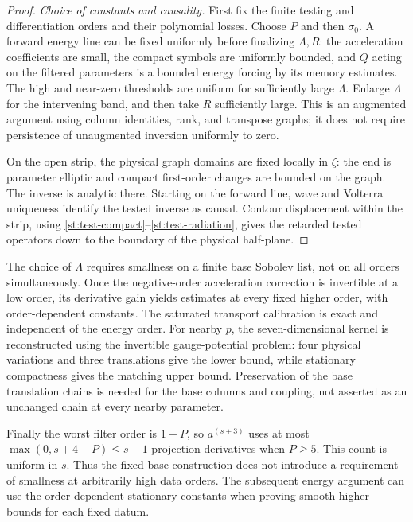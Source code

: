 \begin{proof}
\emph{Choice of constants and causality.}
First fix the finite testing and differentiation orders and
their polynomial losses.  Choose $P$ and then $\sigma_0$.
A forward energy line can be fixed uniformly before finalizing
$\Lambda,R$: the acceleration coefficients are small, the
compact symbols are uniformly bounded, and $Q$ acting on
the filtered parameters is a bounded energy forcing by its
memory estimates.  The high and near-zero thresholds are
uniform for sufficiently large $\Lambda$.  Enlarge $\Lambda$
for the intervening band, and then take $R$ sufficiently
large.  This is an augmented argument using column identities,
rank, and transpose graphs; it does not require persistence
of unaugmented inversion uniformly to zero.

On the open strip, the physical graph domains are fixed
locally in $\zeta$: the end is parameter elliptic and compact
first-order changes are bounded on the graph.  The inverse is
analytic there.  Starting on the forward line, wave and
Volterra uniqueness identify the tested inverse as causal.
Contour displacement within the strip, using
\eqref{st:test-compact}--\eqref{st:test-radiation}, gives
the retarded tested operators down to the boundary of the
physical half-plane.
\end{proof}

\begin{remark}
\label{st:order-quantifiers}
The choice of $\Lambda$ requires smallness on a finite base
Sobolev list, not on all orders simultaneously.  Once the
negative-order acceleration correction is invertible at a low
order, its derivative gain yields estimates at every fixed
higher order, with order-dependent constants.  The saturated
transport calibration is exact and independent of the energy
order.  For nearby $p$, the seven-dimensional kernel is
reconstructed using the invertible gauge-potential problem:
four physical variations and three translations give the
lower bound, while stationary compactness gives the matching
upper bound.  Preservation of the base translation chains is
needed for the base columns and coupling, not asserted as
an unchanged chain at every nearby parameter.

Finally the worst filter order is $1-P$, so
$a^{(s+3)}$ uses at most
$\max(0,s+4-P)\leq s-1$ projection derivatives when $P\geq5$.
This count is uniform in $s$.  Thus the fixed base construction
does not introduce a requirement of smallness at arbitrarily
high data orders.  The subsequent energy argument can use the
order-dependent stationary constants when proving smooth
higher bounds for each fixed datum.
\end{remark}
